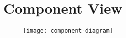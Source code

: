 \section{Component View}

\begin{figure}[H]
	\centering
	\texttt{[image: component-diagram]}
	\caption[Component Diagram]{}
	\label{fig:component-diagram}
\end{figure}
